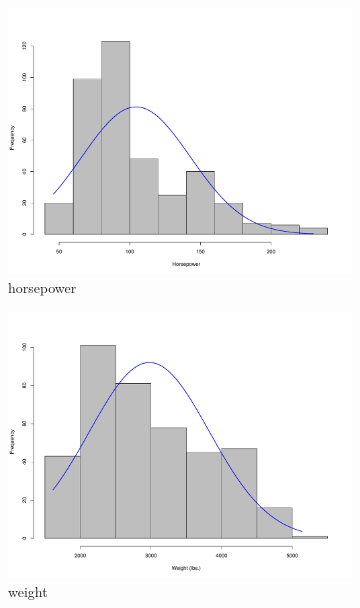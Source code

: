 \documentclass{homework}
\begin{document}
\begin{figure}[h]
\begin{subfigure}[b]{0.3\textwidth}
        \includegraphics[width=\textwidth]{graphs/histHP.pdf}
        \caption{horsepower}
        \label{fig:HP}
    \end{subfigure}
    \begin{subfigure}[b]{0.3\textwidth}
        \includegraphics[width=\textwidth]{graphs/histWei.pdf}
        \caption{weight}
        \label{fig:HP}
    \end{subfigure}
    \begin{subfigure}[b]{0.3\textwidth}

\end{subfigure}
\end{figure}
\end{document}
